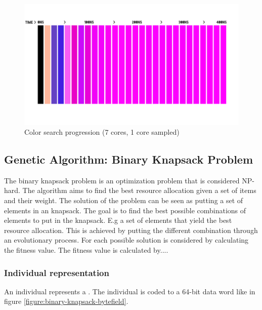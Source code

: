 \begin{figure}[H]
    \begin{center}
        \includegraphics[width=\textwidth]{fig/color-search}
    \caption{Color search progression (7 cores, 1 core sampled)}
    \label{figure:color-search}
    \end{center}
\end{figure}

\subsection{Genetic Algorithm: Binary Knapsack Problem}

The binary knapsack problem is an optimization problem that is considered NP-hard. The algorithm aims to find the best resource allocation given a set of items and their weight. The solution of the problem can be seen as putting a set of elements in an knapsack. The goal is to find the best possible combinations of elements to put in the knapsack. E.g  a set of elements that yield the best resource allocation. This is achieved by putting the different combination through an evolutionary process. For each possible solution is considered by calculating the fitness value. The fitness value is calculated by....







\subsubsection{Individual representation}

An individual represents a .
The individual is coded to a 64-bit data word like in figure \vref{figure:binary-knapsack-bytefield}.

